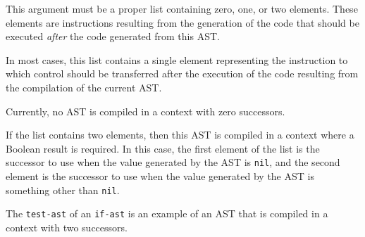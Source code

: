 

This argument must be a proper list containing zero, one, or two
elements.  These elements are instructions resulting from the
generation of the code that should be executed \emph{after} the code
generated from this AST.

In most cases, this list contains a single element representing the
instruction to which control should be transferred after the execution
of the code resulting from the compilation of the current AST.

Currently, no AST is compiled in a context with zero successors.

If the list contains two elements, then this AST is compiled in a
context where a Boolean result is required.  In this case, the first
element of the list is the successor to use when the value generated
by the AST is \texttt{nil}, and the second element is the successor to
use when the value generated by the AST is something other than
\texttt{nil}.

The \texttt{test-ast} of an \texttt{if-ast} is an example of an AST
that is compiled in a context with two successors.





